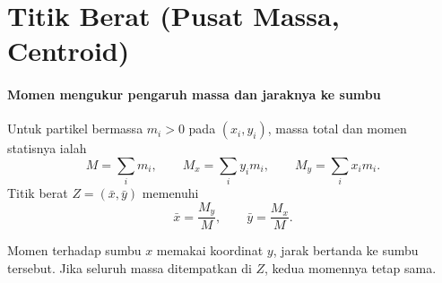 \documentclass{../../kalkulus-ppt}
\begin{document}
\section[Titik Berat]{Titik Berat (Pusat Massa, Centroid)}

\begin{frame}{\insertsection}
    \framesubtitle{Momen mengukur pengaruh massa dan jaraknya ke sumbu}
    \begin{definisi}
        Untuk partikel bermassa $m_i>0$ pada $(x_i,y_i)$, massa total dan
        momen statisnya ialah
        \[
            M=\sum_i m_i,\qquad M_x=\sum_i y_i m_i,\qquad M_y=\sum_i x_i m_i.
        \]
        Titik berat $Z=(\bar x,\bar y)$ memenuhi
        \[
            \bar x=\frac{M_y}{M},\qquad \bar y=\frac{M_x}{M}.
        \]
    \end{definisi}
    Momen terhadap sumbu $x$ memakai koordinat $y$, jarak bertanda
    ke sumbu tersebut. Jika seluruh massa ditempatkan di $Z$,
    kedua momennya tetap sama.
\end{frame}
\end{document}
